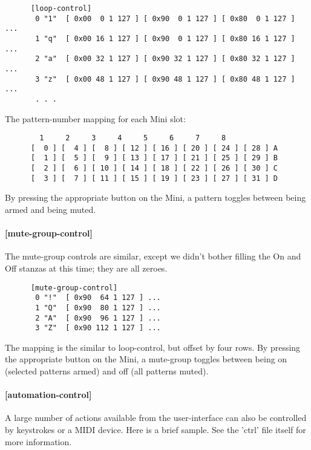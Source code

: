    \begin{verbatim}
      [loop-control]
       0 "1"  [ 0x00  0 1 127 ] [ 0x90  0 1 127 ] [ 0x80  0 1 127 ] ...
       1 "q"  [ 0x00 16 1 127 ] [ 0x90  0 1 127 ] [ 0x80 16 1 127 ] ...
       2 "a"  [ 0x00 32 1 127 ] [ 0x90 32 1 127 ] [ 0x80 32 1 127 ] ...
       3 "z"  [ 0x00 48 1 127 ] [ 0x90 48 1 127 ] [ 0x80 48 1 127 ] ...
       . . .
   \end{verbatim}

   The pattern-number mapping for each Mini slot:

   \begin{verbatim}
        1     2     3     4     5     6     7     8 
      [  0 ] [  4 ] [  8 ] [ 12 ] [ 16 ] [ 20 ] [ 24 ] [ 28 ] A
      [  1 ] [  5 ] [  9 ] [ 13 ] [ 17 ] [ 21 ] [ 25 ] [ 29 ] B
      [  2 ] [  6 ] [ 10 ] [ 14 ] [ 18 ] [ 22 ] [ 26 ] [ 30 ] C
      [  3 ] [  7 ] [ 11 ] [ 15 ] [ 19 ] [ 23 ] [ 27 ] [ 31 ] D
   \end{verbatim}

   By pressing the appropriate button on the Mini, a pattern toggles between
   being armed and being muted.

\paragraph{[mute-group-control]}
\label{paragraph:patterns_mute_group_control}

   The mute-group controls are similar, except we didn't bother filling the On
   and Off stanzas at this time; they are all zeroes.

   \begin{verbatim}
      [mute-group-control]
       0 "!"  [ 0x90  64 1 127 ] ...
       1 "Q"  [ 0x90  80 1 127 ] ...
       2 "A"  [ 0x90  96 1 127 ] ...
       3 "Z"  [ 0x90 112 1 127 ] ...
   \end{verbatim}

   The mapping is the similar to loop-control, but offset by four rows.
   By pressing the appropriate button on the Mini, a mute-group toggles between
   being on (selected patterns armed) and off (all patterns muted).

\paragraph{[automation-control]}
\label{paragraph:patterns_automation_control}

   A large number of actions available from the user-interface can also be
   controlled by keystrokes or a MIDI device.  Here is a brief sample.  See the
   'ctrl' file itself for more information.

